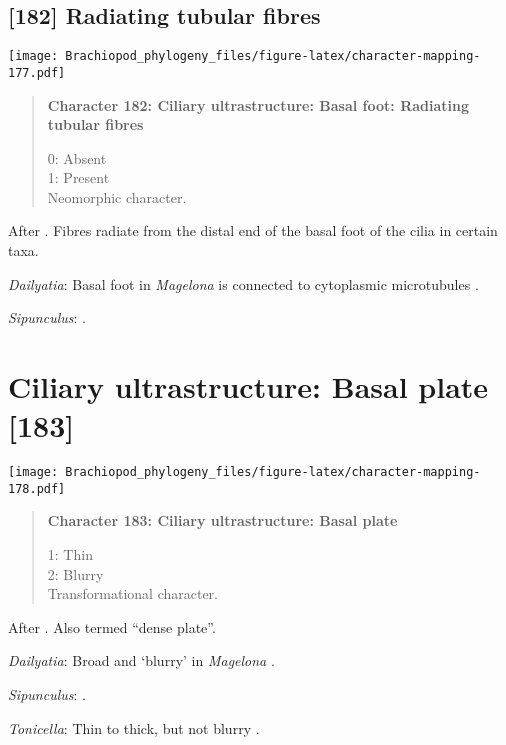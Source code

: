 \documentclass[openany]{book}
\theoremstyle{definition}
\theoremstyle{definition}
\theoremstyle{definition}
\theoremstyle{remark}
\begin{document}
\subsection*{{[}182{]} Radiating tubular
fibres}\label{radiating-tubular-fibres}

\texttt{[image: Brachiopod\_phylogeny\_files/figure-latex/character-mapping-177.pdf]}

\begin{quote}
\textbf{Character 182: Ciliary ultrastructure: Basal foot: Radiating
tubular fibres}

0: Absent\\
1: Present\\
Neomorphic character.
\end{quote}

After \citet{Lundin2009}. Fibres radiate from the distal end of the
basal foot of the cilia in certain taxa.

\hypertarget{Dailyatia-coding-182}{}
\emph{Dailyatia}: Basal foot in \emph{Magelona} is connected to
cytoplasmic microtubules \citep{Bartolomaeus1995}.

\hypertarget{Sipunculus-coding-182}{}
\emph{Sipunculus}: \citet{Reed1982}.

\section{Ciliary ultrastructure: Basal plate
{[}183{]}}\label{ciliary-ultrastructure-basal-plate-183}

\texttt{[image: Brachiopod\_phylogeny\_files/figure-latex/character-mapping-178.pdf]}

\begin{quote}
\textbf{Character 183: Ciliary ultrastructure: Basal plate}

1: Thin\\
2: Blurry\\
Transformational character.
\end{quote}

After \citet{Lundin2009}. Also termed ``dense plate''.

\hypertarget{Dailyatia-coding-183}{}
\emph{Dailyatia}: Broad and `blurry' in \emph{Magelona}
\citep{Bartolomaeus1995}.

\hypertarget{Sipunculus-coding-183}{}
\emph{Sipunculus}: \citet{Reed1982}.

\hypertarget{Tonicella-coding-183}{}
\emph{Tonicella}: Thin to thick, but not blurry \citep{Luter1995}.
\end{document}
